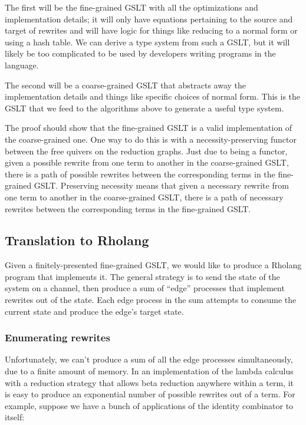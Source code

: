 \documentclass{article}
\begin{document}
The first will be the fine-grained GSLT with all the optimizations and implementation details; it will only have equations pertaining to the source and target of rewrites and will have logic for things like reducing to a normal form or using a hash table.  We can derive a type system from such a GSLT, but it will likely be too complicated to be used by developers writing programs in the language.

The second will be a coarse-grained GSLT that abstracts away the implementation details and things like specific choices of normal form.  This is the GSLT that we feed to the algorithms above to generate a useful type system.

The proof should show that the fine-grained GSLT is a valid implementation of the coarse-grained one.  One way to do this is with a necessity-preserving functor between the free quivers on the reduction graphs.  Just due to being a functor, given a possible rewrite from one term to another in the coarse-grained GSLT, there is a path of possible rewrites between the corresponding terms in the fine-grained GSLT. Preserving necessity means that given a necessary rewrite from one term to another in the coarse-grained GSLT, there is a path of necessary rewrites between the corresponding terms in the fine-grained GSLT.

\subsection{Translation to Rholang}

Given a finitely-presented fine-grained GSLT, we would like to produce a Rholang program that implements it.  The general strategy is to send the state of the system on a channel, then produce a sum of ``edge'' processes that implement rewrites out of the state.  Each edge process in the sum attempts to consume the current state and produce the edge's target state.

\subsubsection{Enumerating rewrites}

Unfortunately, we can't produce a sum of all the edge processes simultaneously, due to a finite amount of memory.  In an implementation of the lambda calculus with a reduction strategy that allows beta reduction anywhere within a term, it is easy to produce an exponential number of possible rewrites out of a term.  For example, suppose we have a bunch of applications of the identity combinator to itself:
\end{document}

